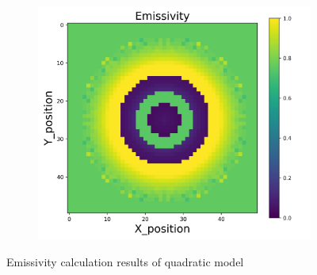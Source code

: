 \begin{figure}[p]
\begin{minipage}{\textwidth}
\begin{subfigure}{0.325\textwidth}
        \end{subfigure}
        \begin{subfigure}{0.325\textwidth}
            \centering
            \includegraphics[width=\textwidth]{figures/raw_data/33/quad/emi_cal.jpg}
        \end{subfigure}
    \end{minipage}
    \caption{Emissivity calculation results of quadratic model}  
\end{figure}


\newpage
